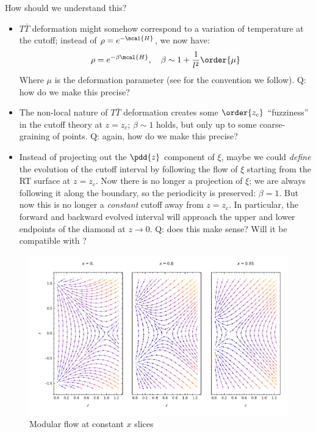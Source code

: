 \documentclass[a4paper
	,10pt
]{article}
\begin{document}
	How should we understand this?
	\begin{itemize}
	\item $T\bar{T}$ deformation might somehow correspond to a variation of temperature at the cutoff; instead of $\rho = e^{-\mcal{H}}$, we now have:
	\begin{equation}
		\rho = e^{-\beta\mcal{H}},
	\quad \beta \sim 1 + \frac{1}{l^2} \order{\mu}
	\end{equation}
	Where $\mu$ is the deformation parameter (see \cite{Apolo:2019zai} for the convention we follow). Q: how do we make this precise?
	
	\item The non-local nature of $T\bar{T}$ deformation creates some $\order{z_c}$ ``fuzziness'' in the cutoff theory at $z = z_c$; $\beta \sim 1$ holds, but only up to some coarse-graining of points. Q: again, how do we make this precise?
	
	\item Instead of projecting out the $\pdd{z}$ component of $\xi$, maybe we could \textit{define} the evolution of the cutoff interval by following the flow of $\xi$ starting from the RT surface at $z = z_c$. Now there is no longer a projection of $\xi$; we are always following it along the boundary, so the periodicity is preserved: $\beta = 1$. But now this is no longer a \textit{constant} cutoff away from $z = z_c$. In particular, the forward and backward evolved interval will approach the upper and lower endpoints of the diamond at $z \to 0$. Q: does this make sense? Will it be compatible with \textcite{McGough:2016lol}?
	\end{itemize}
	
	\begin{figure}[!h]
	\centering
	\includegraphics[width=.8\linewidth]{img/modFlowXsection.pdf}
	\hspace{2em}
	\vspace{-2ex}
	\caption{Modular flow at constant $x$ slices}
	\end{figure}
	
\end{document}
